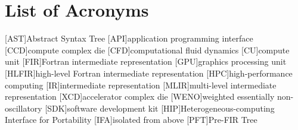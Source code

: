 \section*{List of Acronyms}

\begin{acronym}[paper]
[AST]{Abstract Syntax Tree}
[API]{application programming interface}
[CCD]{compute complex die}
[CFD]{computational fluid dynamics}
[CU]{compute unit}
[FIR]{Fortran intermediate representation}
[GPU]{graphics processing unit}
[HLFIR]{high-level Fortran intermediate representation}
[HPC]{high-performance computing}
[IR]{intermediate representation}
[MLIR]{multi-level intermediate representation}
[XCD]{accelerator complex die}
[WENO]{weighted essentially non-oscillatory}
[SDK]{software development kit}
[HIP]{Heterogeneous-computing Interface for Portability}
[IFA]{isolated from above}
[PFT]{Pre-FIR Tree}
\end{acronym}